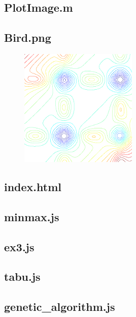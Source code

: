 \documentclass[a4paper,12pt]{article}
\begin{document}
\subsection{PlotImage.m}



\subsection{ Bird.png }

\begin{figure}[H]
\centering
\includegraphics[width=0.5\textwidth]{../Bird.png}
\end{figure}

\subsection{index.html}



\subsection{minmax.js}



\subsection{ex3.js}



\subsection{ tabu.js }



\subsection{ genetic\_algorithm.js }


\end{document}
